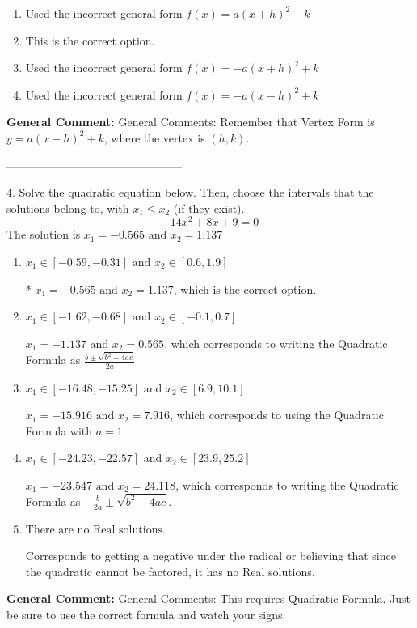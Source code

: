\documentclass{extbook}[14pt]
\begin{document}
\begin{enumerate}[label=\Alph*.] 
\item Used the incorrect general form $f(x) = a(x+h)^2 + k$  
\item This is the correct option.  
\item Used the incorrect general form $f(x) = -a(x+h)^2 + k$  
\item Used the incorrect general form $f(x) = -a(x-h)^2 + k$  
\end{enumerate} 
 
\textbf{General Comment:} General Comments: Remember that Vertex Form is $y = a(x-h)^2+k$, where the vertex is $(h, k)$. 

-----------------------------------------------

4. Solve the quadratic equation below. Then, choose the intervals that the solutions belong to, with $x_1 \leq x_2$ (if they exist).
\[ -14x^{2} +8 x + 9 = 0 \] 
The solution is $ x_1 = -0.565 \text{ and } x_2 = 1.137 $ 

\begin{enumerate}[label=\Alph*.] 
\item $ x_1 \in [-0.59, -0.31] \text{ and } x_2 \in [0.6, 1.9] $ 

 * $x_1 = -0.565 \text{ and } x_2 = 1.137$, which is the correct option. 
\item $ x_1 \in [-1.62, -0.68] \text{ and } x_2 \in [-0.1, 0.7] $ 

  $x_1 = -1.137 \text{ and } x_2 = 0.565$, which corresponds to writing the Quadratic Formula as $\frac{b \pm \sqrt{b^2 - 4ac}}{2a}$ 
\item $ x_1 \in [-16.48, -15.25] \text{ and } x_2 \in [6.9, 10.1] $ 

  $x_1 = -15.916 \text{ and } x_2 = 7.916$, which corresponds to using the Quadratic Formula with $a=1$ 
\item $ x_1 \in [-24.23, -22.57] \text{ and } x_2 \in [23.9, 25.2] $ 

  $x_1 = -23.547 \text{ and } x_2 = 24.118$, which corresponds to writing the Quadratic Formula as $-\frac{b}{2a} \pm \sqrt{b^2 - 4ac}$. 
\item $ \text{There are no Real solutions.} $ 

 Corresponds to getting a negative under the radical or believing that since the quadratic cannot be factored, it has no Real solutions. 
\end{enumerate} 
 
\textbf{General Comment:} General Comments: This requires Quadratic Formula. Just be sure to use the correct formula and watch your signs. 
\end{document}
